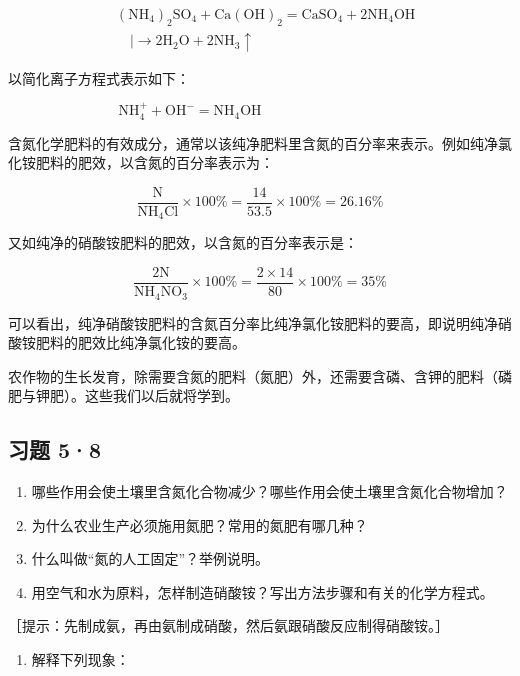 \[
\begin{array}{rl} & (\mathrm{NH} _ {4}) _ {2} \mathrm{SO} _ {4} + \mathrm{Ca(OH)} _ {2} = \mathrm{CaSO} _ {4} + 2 \mathrm{NH} _ {4} \mathrm{OH} \\ & \quad \mid \longrightarrow 2 \mathrm{H} _ {2} \mathrm{O} + 2 \mathrm{NH} _ {3} \uparrow \end{array}
\]

以简化离子方程式表示如下：

\[
\mathrm{NH} _ {4} ^ {+} + \mathrm{OH} ^ {-} = \mathrm{NH} _ {4} \mathrm{OH} \quad \text {   } \quad \text {   } \quad \text {   } \quad \text {   } \quad \text {   } \quad \text {   }
\]

含氮化学肥料的有效成分，通常以该纯净肥料里含氮的百分率来表示。例如纯净氯化铵肥料的肥效，以含氮的百分率表示为：

\[
\frac {\mathrm{N}}{\mathrm{NH} _ {4} \mathrm{Cl}} \times 100 \% = \frac {14}{53.5} \times 100 \% = 26.16 \%
\]

又如纯净的硝酸铵肥料的肥效，以含氮的百分率表示是：

\[
\frac {2 \mathrm{N}}{\mathrm{NH} _ {4} \mathrm{NO} _ {3}} \times 100 \% = \frac {2 \times 14}{80} \times 100 \% = 35 \%
\]

可以看出，纯净硝酸铵肥料的含氮百分率比纯净氯化铵肥料的要高，即说明纯净硝酸铵肥料的肥效比纯净氯化铵的要高。

农作物的生长发育，除需要含氮的肥料（氮肥）外，还需要含磷、含钾的肥料（磷肥与钾肥）。这些我们以后就将学到。

\subsection{习题 5·8}

\begin{enumerate}
\item
  哪些作用会使土壤里含氮化合物减少？哪些作用会使土壤里含氮化合物增加？
\item
  为什么农业生产必须施用氮肥？常用的氮肥有哪几种？
\item
  什么叫做``氮的人工固定''？举例说明。
\item
  用空气和水为原料，怎样制造硝酸铵？写出方法步骤和有关的化学方程式。
\end{enumerate}

［提示：先制成氨，再由氨制成硝酸，然后氨跟硝酸反应制得硝酸铵。］

\begin{enumerate}[start=5]
\item
  解释下列现象：
\end{enumerate}


